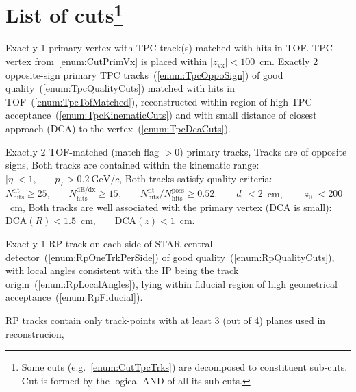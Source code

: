 \section[List of cuts]{List of cuts\footnote{Some cuts (e.g.~\ref{enum:CutTpcTrks}) are decomposed to constituent sub-cuts. Cut is formed by the logical AND of all its sub-cuts.}}\label{sec:listOfCuts}
\begin{enumerate}[label=\textbf{C\arabic*},ref=C\arabic*]
 \itemm Exactly 1 primary vertex with TPC track(s) matched with hits in TOF.\label{enum:CutPrimVx}
 \itemm TPC vertex from~\ref{enum:CutPrimVx} is placed within $|z_{\textrm{vx}}|<100$~cm.\label{enum:CutZVx}
 \itemm Exactly 2 opposite-sign primary TPC tracks~(\ref{enum:TpcOppoSign}) of good quality~(\ref{enum:TpcQualityCuts}) matched with hits in TOF~(\ref{enum:TpcTofMatched}), reconstructed within region of high TPC acceptance~(\ref{enum:TpcKinematicCuts}) and with small distance of closest approach (DCA) to the vertex~(\ref{enum:TpcDcaCuts}).\label{enum:CutTpcTrks}
    \begin{enumerate}[label=\textbf{\theenumi.\arabic*},ref=\theenumi.\arabic*]
      \itemm Exactly 2 TOF-matched (match flag $>0$) primary tracks,\label{enum:TpcTofMatched}
      \itemm Tracks are of opposite signs,\label{enum:TpcOppoSign}
      \itemm Both tracks are contained within the kinematic range:\label{enum:TpcKinematicCuts}\\[2pt]
      $|\eta|<1$,~~~~$p_{T}>0.2~\textrm{GeV}/c$,
      \itemm Both tracks satisfy quality criteria:\label{enum:TpcQualityCuts}\\[2pt]
      $N_{\textrm{hits}}^{\textrm{fit}}\geq25$,~~~~$N_{\textrm{hits}}^{\textrm{dE/dx}}\geq15$,~~~~$N_{\textrm{hits}}^{\textrm{fit}}/N_{\textrm{hits}}^{\textrm{poss}}\geq0.52$,~~~~$d_{0}<2$~cm,~~~~$|z_{0}|<200$~cm,
      \itemm Both tracks are well associated with the primary vertex (DCA is small):\label{enum:TpcDcaCuts}\\[2pt]
      $\textrm{DCA}(R)<1.5$~cm,~~~~$\textrm{DCA}(z)<1$~cm.
    \end{enumerate}
 \itemm Exactly 1 RP track on each side of STAR central detector~(\ref{enum:RpOneTrkPerSide}) of good quality~(\ref{enum:RpQualityCuts}), with local angles consistent with the IP being the track origin~(\ref{enum:RpLocalAngles}), lying within fiducial region of high geometrical acceptance~(\ref{enum:RpFiducial}).\label{enum:CutRpTrks}
      \begin{enumerate}[label=\textbf{\theenumi.\arabic*},ref=\theenumi.\arabic*]
      \itemm RP tracks contain only track-points with at least 3 (out of 4) planes used in reconstrucion,\label{enum:RpQualityCuts}

\end{enumerate}
\end{enumerate}

